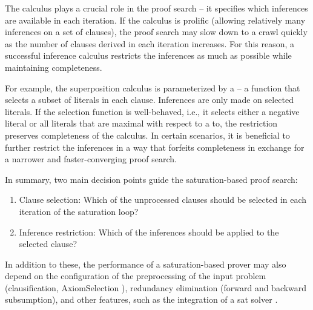 The calculus plays a crucial role in the proof search -- it specifies which inferences are available in each iteration.
If the calculus is prolific (allowing relatively many inferences on a set of clauses), the proof search may slow down to a crawl quickly as the number of clauses derived in each iteration increases.
For this reason, a successful inference calculus restricts the inferences as much as possible while maintaining completeness.

For example, the superposition calculus \cite{DBLP:journals/logcom/BachmairG94}
is parameterized by a  -- a function that selects a subset of literals in each clause.
Inferences are only made on selected literals.
If the selection function is well-behaved,
i.e., it selects either a negative literal or all literals that are maximal with respect to a \gls{to},
the restriction preserves completeness of the calculus.
In certain scenarios, it is beneficial to further restrict the inferences in a way that forfeits completeness
in exchange for a narrower and faster-converging proof search.



In summary, two main decision points guide the \gls{saturation}-based proof search:
\begin{enumerate}
\item Clause selection: Which of the unprocessed clauses should be selected in each iteration of the saturation loop?
\item Inference restriction: Which of the inferences should be applied to the selected clause?
\end{enumerate}

In addition to these, the performance of a saturation-based prover may also depend on the configuration of the preprocessing of the input problem (clausification, \gls{AxiomSelection} \cite{DBLP:conf/cade/HoderV11,DBLP:conf/cade/KuhlweinLTUH12}), redundancy elimination (forward and backward subsumption), and other features, such as the integration of a \gls{sat} solver \cite{DBLP:conf/cav/Voronkov14}.

